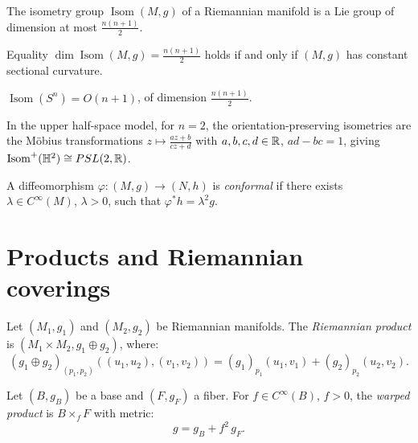 \begin{theorem}
The isometry group $\operatorname{Isom}(M, g)$ of a Riemannian manifold is a
Lie group of dimension at most $\frac{n(n+1)}{2}$.
\end{theorem}

\begin{remark}
Equality $\dim \operatorname{Isom}(M,g) = \frac{n(n+1)}{2}$ holds if and only if
$(M, g)$ has constant sectional curvature.
\end{remark}

\begin{example}[Isometries of $S^n$]
$\operatorname{Isom}(S^n) = O(n+1)$, of dimension $\frac{n(n+1)}{2}$.
\end{example}

\begin{example}
In the upper half-space model, for $n=2$, the orientation-preserving isometries
are the M\"obius transformations $z \mapsto \frac{az+b}{cz+d}$ with
$a, b, c, d \in \mathbb{R}$, $ad - bc = 1$, giving $\operatorname{Isom}^+(\mathbb{H}^2)
\cong PSL(2, \mathbb{R})$.
\end{example}

\begin{definition}
A diffeomorphism $\varphi : (M,g) \to (N,h)$ is \emph{conformal} if there exists
$\lambda \in C^\infty(M)$, $\lambda > 0$, such that $\varphi^* h = \lambda^2 g$.
\end{definition}

\section{Products and Riemannian coverings}

\begin{definition}
Let $(M_1, g_1)$ and $(M_2, g_2)$ be Riemannian manifolds. The \emph{Riemannian
product} is $(M_1 \times M_2, g_1 \oplus g_2)$, where:
\[
    (g_1 \oplus g_2)_{(p_1, p_2)}((u_1, u_2), (v_1, v_2))
    = (g_1)_{p_1}(u_1, v_1) + (g_2)_{p_2}(u_2, v_2).
\]
\end{definition}

\begin{definition}
Let $(B, g_B)$ be a base and $(F, g_F)$ a fiber. For $f \in C^\infty(B)$, $f > 0$,
the \emph{warped product} is $B \times_f F$ with metric:
\[
    g = g_B + f^2 \, g_F.
\]
\end{definition}

